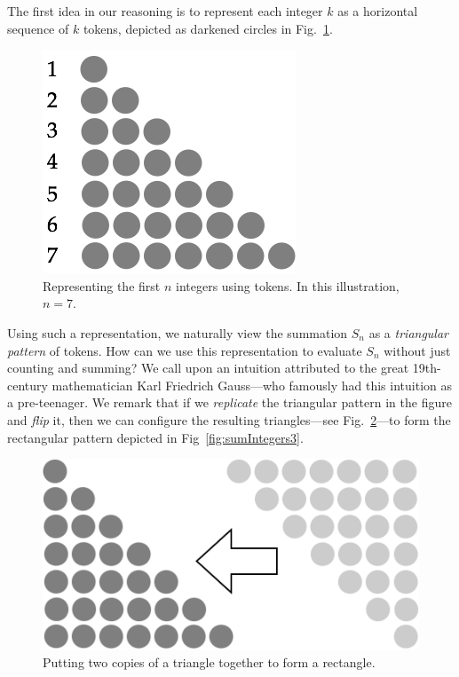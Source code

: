 The first idea in our reasoning is to represent each integer $k$ as a horizontal sequence of $k$ tokens, depicted as darkened circles in Fig.~\ref{fig:sumIntegers1}.
\begin{figure}[ht]
\begin{center}
       \includegraphics[scale=0.35]{FiguresMaths/SumIntegersBasis}
\caption{Representing the first $n$ integers using tokens.  In
  this illustration, $n=7$.}
       \label{fig:sumIntegers1}
\end{center}
\end{figure}
Using such a representation, we naturally view the summation $S_n$ as a \textit{triangular pattern} of tokens.  How can we use this representation to evaluate $S_n$ without just counting and summing?  We call upon an intuition attributed to the great 19th-century mathematician Karl Friedrich Gauss---who famously had this intuition as a pre-teenager.  We remark that if we {\em replicate} the triangular pattern in the figure and {\em flip} it, then we can configure the resulting triangles---see Fig.~\ref{fig:sumIntegers2}---to form the rectangular pattern depicted in Fig~\ref{fig:sumIntegers3}.
\begin{figure}[ht]
\begin{center}
       \includegraphics[scale=0.35]{FiguresMaths/SumIntegersIntermediate}
   \caption{Putting two copies of a triangle together to form a rectangle.}
       \label{fig:sumIntegers2}
\end{center}
\end{figure}
